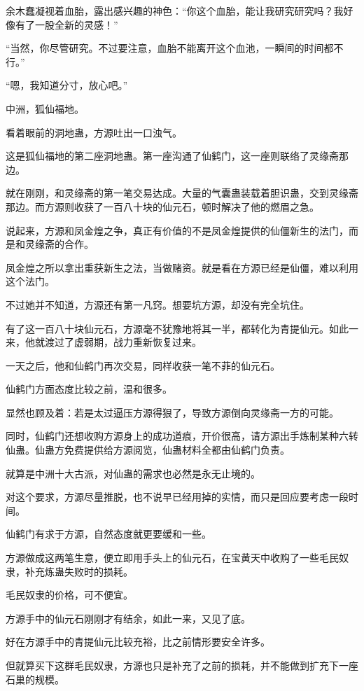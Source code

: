 \begin{this_body}
余木蠢凝视着血胎，露出感兴趣的神色：“你这个血胎，能让我研究研究吗？我好像有了一股全新的灵感！”

“当然，你尽管研究。不过要注意，血胎不能离开这个血池，一瞬间的时间都不行。”

“嗯，我知道分寸，放心吧。”

中洲，狐仙福地。

看着眼前的洞地蛊，方源吐出一口浊气。

这是狐仙福地的第二座洞地蛊。第一座沟通了仙鹤门，这一座则联络了灵缘斋那边。

就在刚刚，和灵缘斋的第一笔交易达成。大量的气囊蛊装载着胆识蛊，交到灵缘斋那边。而方源则收获了一百八十块的仙元石，顿时解决了他的燃眉之急。

说起来，方源和凤金煌之争，真正有价值的不是凤金煌提供的仙僵新生的法门，而是和灵缘斋的合作。

凤金煌之所以拿出重获新生之法，当做赌资。就是看在方源已经是仙僵，难以利用这个法门。

不过她并不知道，方源还有第一凡窍。想要坑方源，却没有完全坑住。

有了这一百八十块仙元石，方源毫不犹豫地将其一半，都转化为青提仙元。如此一来，他就渡过了虚弱期，战力重新恢复过来。

一天之后，他和仙鹤门再次交易，同样收获一笔不菲的仙元石。

仙鹤门方面态度比较之前，温和很多。

显然也顾及着：若是太过逼压方源得狠了，导致方源倒向灵缘斋一方的可能。

同时，仙鹤门还想收购方源身上的成功道痕，开价很高，请方源出手炼制某种六转仙蛊。仙蛊方免费提供给方源阅览，仙蛊材料全都由仙鹤门负责。

就算是中洲十大古派，对仙蛊的需求也必然是永无止境的。

对这个要求，方源尽量推脱，也不说早已经用掉的实情，而只是回应要考虑一段时间。

仙鹤门有求于方源，自然态度就更要缓和一些。

方源做成这两笔生意，便立即用手头上的仙元石，在宝黄天中收购了一些毛民奴隶，补充炼蛊失败时的损耗。

毛民奴隶的价格，可不便宜。

方源手中的仙元石刚刚才有结余，如此一来，又见了底。

好在方源手中的青提仙元比较充裕，比之前情形要安全许多。

但就算买下这群毛民奴隶，方源也只是补充了之前的损耗，并不能做到扩充下一座石巢的规模。


\end{this_body}
